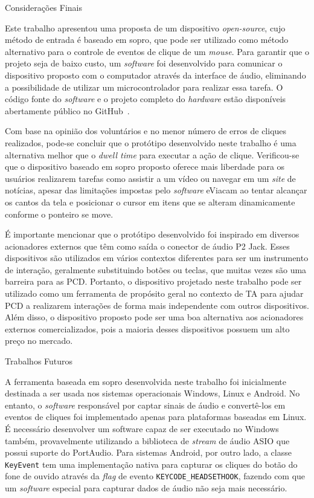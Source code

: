\begin{chapter}{Considerações Finais}

Este trabalho apresentou uma proposta de um dispositivo \textit{open-source},
cujo método de entrada é baseado em sopro, que pode ser utilizado como método
alternativo para o controle de eventos de clique de um \textit{mouse}. Para
garantir que o projeto seja de baixo custo, um \textit{software} foi desenvolvido
para comunicar o dispositivo proposto com o computador através da interface de
áudio, eliminando a possibilidade de utilizar um microcontrolador para realizar
essa tarefa. O código fonte do \textit{software} e o projeto completo do
\textit{hardware} estão disponíveis abertamente público no 
GitHub~\cite{ErickGit}.

Com base na opinião dos voluntários e no menor número de erros de cliques
realizados, pode-se concluir que o protótipo desenvolvido neste trabalho é uma
alternativa melhor que o \textit{dwell time} para executar a ação
de clique. Verificou-se que o dispositivo baseado em sopro proposto oferece mais
liberdade para os usuários realizarem tarefas como assistir a um vídeo ou
navegar em um \textit{site} de notícias, apesar das limitações impostas pelo
\textit{software} eViacam ao tentar alcançar os cantos da tela e posicionar o
cursor em itens que se alteram dinamicamente conforme o ponteiro se move.

É importante mencionar que o protótipo desenvolvido foi inspirado em diversos
acionadores externos que têm como saída o conector de áudio P2 Jack. Esses
dispositivos são utilizados em vários contextos diferentes para ser um
instrumento de interação, geralmente substituindo botões ou teclas, que muitas
vezes são uma barreira para as PCD. Portanto, o dispositivo projetado neste
trabalho pode ser utilizado como um ferramenta de propósito geral no contexto de
TA para ajudar PCD a realizarem interações de forma mais
independente com outros dispositivos. Além disso, o dispositivo proposto pode
ser uma boa alternativa aos acionadores externos comercializados, pois a maioria
desses dispositivos possuem um alto preço no mercado.

\begin{section}{Trabalhos Futuros}

A ferramenta baseada em sopro desenvolvida neste trabalho foi inicialmente
destinada a ser usada nos sistemas operacionais Windows, Linux e Android. No
entanto, o \textit{software} responsável por captar sinais de áudio e
convertê-los em eventos de cliques foi implementado apenas para plataformas
baseadas em Linux. É necessário desenvolver um software capaz de ser executado
no Windows também, provavelmente utilizando a biblioteca de \textit{stream} de
áudio ASIO que possui suporte do PortAudio. Para sistemas Android, por outro
lado, a classe \texttt{KeyEvent} tem uma implementação nativa para capturar os
cliques do botão do fone de ouvido através da \textit{flag} de evento
\texttt{KEYCODE\_HEADSETHOOK}, fazendo com que um \textit{software} especial
para capturar dados de áudio não seja mais necessário.


\end{section}
\end{chapter}
